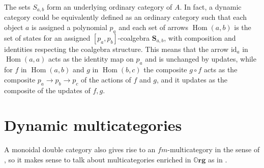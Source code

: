 \documentclass[11pt, one side, article]{memoir}
\theoremstyle{definition}
\theoremstyle{plain}
\DeclareMathOperator{\Hom}{Hom}
\newcommand{\Cat}[1]{\mathbf{#1}}%
\newcommand{\id}{\mathrm{id}}
\newcommand{\0}{\textsf{0}}
\newcommand{\1}{\tn{\textsf{1}}}
\newcommand{\org}{{\mathbb{O}\Cat{rg}}}
\renewcommand{\S}{{\Cat{S}}}
\begin{document}
The sets $S_{a,b}$ form an underlying ordinary category of $A$. 
In fact, a dynamic category could be equivalently defined as an ordinary category such that each object $a$ is assigned a polynomial $p_a$ and each set of arrows $\Hom(a,b)$ is the set of states for an assigned $[p_a,p_b]$-coalgebra $\S_{a,b}$, with composition and identities respecting the coalgebra structure. This means that the arrow $\id_a$ in $\Hom(a,a)$ acts as the identity map on $p_a$ and is unchanged by updates, while for $f$ in $\Hom(a,b)$ and $g$ in $\Hom(b,c)$ the composite $g \circ f$ acts as the composite $p_a \to p_b \to p_c$ of the actions of $f$ and $g$, and it updates as the composite of the updates of $f,g$.



\section{Dynamic multicategories}\label{sec.org_multicats}


A monoidal double category also gives rise to an $f\!m$-multicategory in the sense of \cite{leinster1999generalized}, %
so it makes sense to talk about multicategories enriched in $\org$ as in \cite{leinster1999generalized}. %
\end{document}
